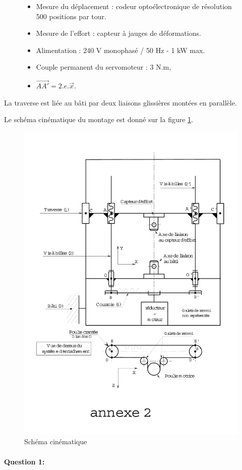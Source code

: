 \begin{figure}[htbp]
\begin{minipage}[c]{.55\linewidth}
\begin{itemize}
 \item Mesure du déplacement : codeur optoélectronique de résolution 500 positions par tour.
 \item Mesure de l'effort : capteur à jauges de déformations.
 \item Alimentation : 240 V monophasé / 50 Hz - 1 kW max.
 \item Couple permanent du servomoteur : 3 N.m,
 \item $\overrightarrow{AA'}=2.e.\overrightarrow{x}$.
\end{itemize}
\end{minipage}
\end{figure}

La traverse est liée au bâti par deux liaisons glissières montées en parallèle.

Le schéma cinématique du montage est donné sur la figure \ref{fig:image4}.

\begin{figure}[htbp]
\begin{center}
\includegraphics[width=0.7\linewidth]{img/cin_EM.pdf}
\caption{Schéma cinématique}
\label{fig:image4}
\end{center}
\end{figure}

\paragraph{Question 1:}

